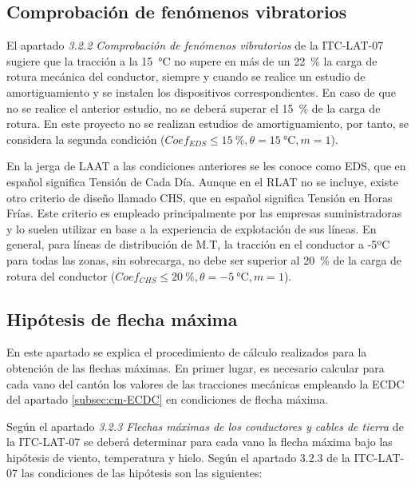 \subsection{Comprobación de fenómenos vibratorios}
\label{subsec:cm-fenomenosVibratorios}
El apartado \textit{3.2.2 Comprobación de fenómenos vibratorios} de la ITC-LAT-07 sugiere que la tracción a la \SI{15}{\celsius} no supere en más de un \SI{22}{\percent} la carga de rotura mecánica del conductor, siempre y cuando se realice un estudio de amortiguamiento y se instalen los dispositivos correspondientes. En caso de que no se realice el anterior estudio, no se deberá superar el \SI{15}{\percent} de la carga de rotura. En este proyecto no se realizan estudios de amortiguamiento, por tanto, se considera la segunda condición ($Coef_{EDS} \leq \SI{15}{\percent}, \theta = \SI{15}{\celsius}, m = 1$).

En la jerga de \ac{LAAT} a las condiciones anteriores se les conoce como \ac{EDS}, que en español significa Tensión de Cada Día. Aunque en el \ac{RLAT} no se incluye, existe otro criterio de diseño llamado \ac{CHS}, que en español significa Tensión en Horas Frías. Este criterio es empleado principalmente por las empresas suministradoras y lo suelen utilizar en base a la experiencia de explotación de sus líneas. En general, para líneas de distribución de M.T, la tracción en el conductor a -5ºC para todas las zonas, sin sobrecarga, no debe ser superior al \SI{20}{\percent} de la carga de rotura del conductor ($Coef_{CHS} \leq \SI{20}{\percent}, \theta = \SI{-5}{\celsius}, m = 1$).

\subsection{Hipótesis de flecha máxima}
\label{subsec:cm-hipotesisFmax}
En este apartado se explica el procedimiento de cálculo realizados para la obtención de las flechas máximas. En primer lugar, es necesario calcular para cada vano del cantón los valores de las tracciones mecánicas  empleando la \ac{ECDC} del apartado \ref{subsec:cm-ECDC} en condiciones de flecha máxima. 

Según el apartado \textit{3.2.3 Flechas máximas de los conductores y cables de tierra} de la ITC-LAT-07 se deberá determinar para cada vano la flecha máxima bajo las hipótesis de viento, temperatura y hielo. Según el apartado 3.2.3 de la ITC-LAT-07 las condiciones de las hipótesis son las siguientes:

